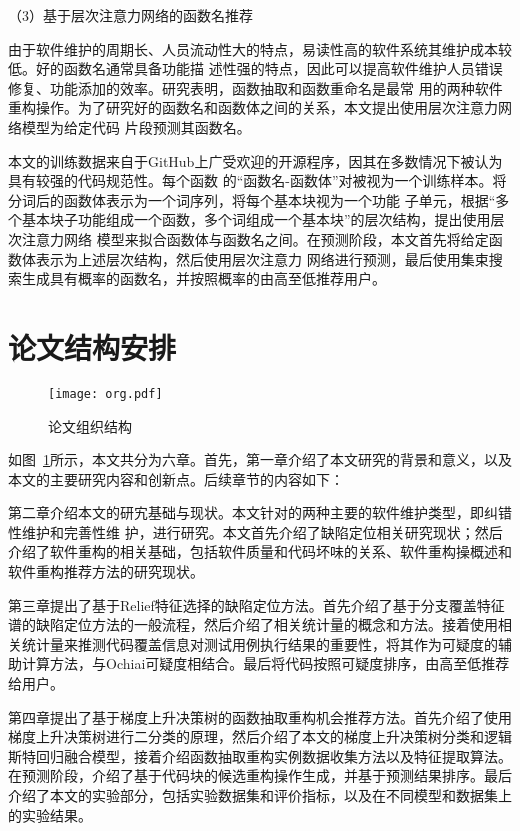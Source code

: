 （3）基于层次注意力网络的函数名推荐

由于软件维护的周期长、人员流动性大的特点，易读性高的软件系统其维护成本较低。好的函数名通常具备功能描
述性强的特点，因此可以提高软件维护人员错误修复、功能添加的效率。研究表明，函数抽取和函数重命名是最常
用的两种软件重构操作。为了研究好的函数名和函数体之间的关系，本文提出使用层次注意力网络模型为给定代码
片段预测其函数名。

本文的训练数据来自于GitHub上广受欢迎的开源程序，因其在多数情况下被认为具有较强的代码规范性。每个函数
的``函数名-函数体''对被视为一个训练样本。将分词后的函数体表示为一个词序列，将每个基本块视为一个功能
子单元，根据``多个基本块子功能组成一个函数，多个词组成一个基本块''的层次结构，提出使用层次注意力网络
模型来拟合函数体与函数名之间。在预测阶段，本文首先将给定函数体表示为上述层次结构，然后使用层次注意力
网络进行预测，最后使用集束搜索生成具有概率的函数名，并按照概率的由高至低推荐用户。

\section{论文结构安排}
\begin{figure}[htp]
  \centering
  \texttt{[image: org.pdf]}
  \caption{论文组织结构}
  \label{fig:org}
\end{figure}

如图~\ref{fig:org}所示，本文共分为六章。首先，第一章介绍了本文研究的背景和意义，以及本文的主要研究内容和创新点。后续章节的内容如下：  

第二章介绍本文的研宄基础与现状。本文针对的两种主要的软件维护类型，即纠错性维护和完善性维
护，进行研究。本文首先介绍了缺陷定位相关研究现状；然后介绍了软件重构的相关基础，包括软件质量和代码坏味的关系、软件重构操概述和软件重构推荐方法的研究现状。

第三章提出了基于Relief特征选择的缺陷定位方法。首先介绍了基于分支覆盖特征谱的缺陷定位方法的一般流程，然后介绍了相关统计量的概念和方法。接着使用相关统计量来推测代码覆盖信息对测试用例执行结果的重要性，将其作为可疑度的辅助计算方法，与Ochiai可疑度相结合。最后将代码按照可疑度排序，由高至低推荐给用户。

第四章提出了基于梯度上升决策树的函数抽取重构机会推荐方法。首先介绍了使用梯度上升决策树进行二分类的原理，然后介绍了本文的梯度上升决策树分类和逻辑斯特回归融合模型，接着介绍函数抽取重构实例数据收集方法以及特征提取算法。在预测阶段，介绍了基于代码块的候选重构操作生成，并基于预测结果排序。最后介绍了本文的实验部分，包括实验数据集和评价指标，以及在不同模型和数据集上的实验结果。

